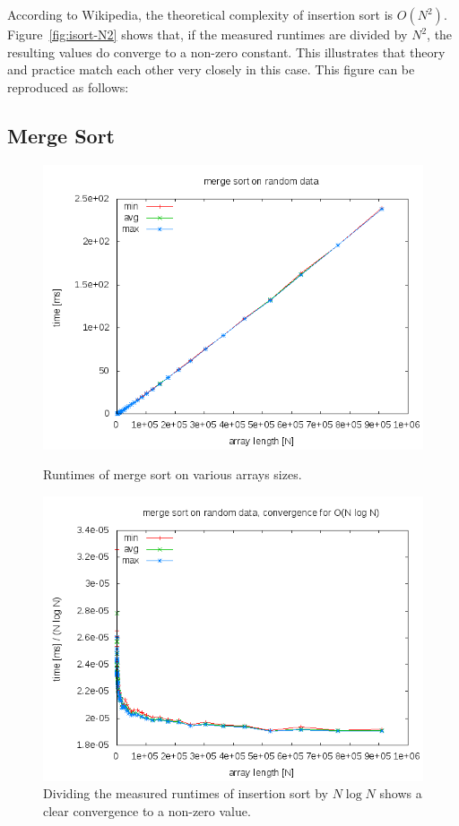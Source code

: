 \documentclass[a4paper,10pt]{article}
\begin{document}
\small\noindent

\normalsize

According to Wikipedia, the theoretical complexity of insertion sort is $O(N^2)$.
Figure~\ref{fig:isort-N2} shows that, if the measured runtimes are divided by $N^2$, the resulting values do converge to a non-zero constant.
This illustrates that theory and practice match each other very closely in this case.
This figure can be reproduced as follows:

\small\noindent

\normalsize



\subsection*{Merge Sort}

\begin{figure}
  \centering
  \includegraphics[width=0.7\columnwidth]{examples/msort.png}
  \caption{
    Runtimes of merge sort on various arrays sizes.
  }\label{fig:msort}
  \vspace{\baselineskip}
  \includegraphics[width=0.7\columnwidth]{examples/msort-NlogN.png}
  \caption{
    Dividing the measured runtimes of insertion sort by $N \log N$ shows a clear convergence to a non-zero value.
  }\label{fig:msort-NlogN}
\end{figure}
\end{document}
